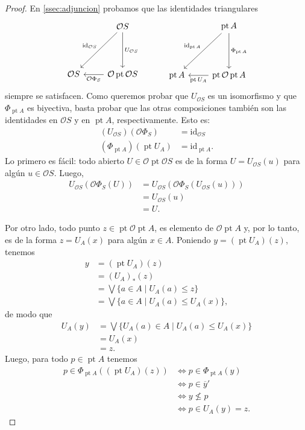 \documentclass[12pt,letterpaper,titlepage]{article}
\theoremstyle{definition}
\newcommand\Sup{\bigvee}
\newcommand\ol[1]{\overline{#1}}
\renewcommand\cal[1]{\mathcal{#1}}
\newcommand\<{\langle}
\renewcommand\>{\rangle}
\newcommand{\id}{\mathrm{id}}
\DeclareMathOperator{\pt}{pt}
\begin{document}
\begin{proof}
    En \ref{ssec:adjuncion} probamos que
    las identidades triangulares
    \[
        \begin{tikzcd}[row sep=15mm]
            & \cal OS \ar[d,"U_{\cal OS}"] \ar[dl,"\id_{\cal OS}"']
            \\
            \cal OS
            & \cal O\pt\cal OS \ar[l,"\cal O\Phi_S"]
        \end{tikzcd}
        \hspace{10mm}
        \begin{tikzcd}[row sep=15mm]
            & \pt A \ar[d,"\Phi_{\pt A}"] \ar[dl,"\id_{\pt A}"']
            \\
            \pt A
            & \pt \cal O\pt A \ar[l,"\pt U_A"]
        \end{tikzcd}
    \]
    siempre se satisfacen.
    Como queremos probar que $U_{\cal OS}$ es un isomorfismo
    y que $\Phi_{\pt A}$ es biyectiva,
    basta probar que las otras composiciones también son
    las identidades en $\cal OS$ y en $\pt A$, respectivamente.
    Esto es:
    \begin{align*}
        (U_{\cal OS})(\cal O\Phi_S) &= \id_{\cal OS} \\
        (\Phi_{\pt A})(\pt U_A) &= \id_{\pt A}.
    \end{align*}
    Lo primero es fácil:
    todo abierto $U\in\cal O\pt\cal OS$ es de la forma
    $U=U_{\cal OS}(u)$ para algún $u\in\cal OS$.
    Luego,
    \begin{align*}
        U_{\cal OS}(\cal O\Phi_S(U))
        &= U_{\cal OS}(\cal O\Phi_S(U_{\cal OS}(u))) \\
        &= U_{\cal OS}(u) \\
        &= U.
    \end{align*}
    
    Por otro lado, todo punto $z\in\pt\cal O\pt A$,
    es elemento de $\cal O\pt A$ y, por lo tanto,
    es de la forma $z=U_A(x)$ para algún $x\in A$.
    Poniendo $y=(\pt U_A)(z)$, tenemos
    \begin{align*}
        y
        &= (\pt U_A)(z) \\
        &= (U_A)_*(z) \\
        &= \Sup\{a\in A\mid U_A(a)\leq z\} \\
        &= \Sup\{a\in A\mid U_A(a)\leq U_A(x)\},
    \end{align*}
    de modo que
    \begin{align*}
        U_A(y)
        &= \Sup\{U_A(a)\in A\mid U_A(a)\leq U_A(x)\} \\
        &= U_A(x) \\
        &= z.
    \end{align*}
    Luego, para todo $p\in\pt A$ tenemos
    \begin{align*}
        p\in\Phi_{\pt A}((\pt U_A)(z))
        &\iff p\in \Phi_{\pt A}(y) \\
        &\iff p\in \ol{y}' \\
        &\iff y\nleq p \\
        &\iff p\in U_A(y) = z.
    \end{align*}
\end{proof}
\end{document}

